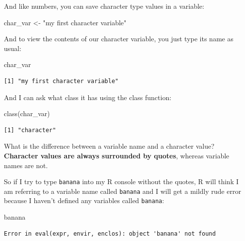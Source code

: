 \documentclass[
  letterpaper,
  DIV=11,
  numbers=noendperiod]{scrreprt}
\newenvironment{Shaded}{\begin{snugshade}}{\end{snugshade}}
\newcommand{\FunctionTok}[1]{\textcolor[rgb]{0.28,0.35,0.67}{#1}}
\newcommand{\NormalTok}[1]{\textcolor[rgb]{0.00,0.23,0.31}{#1}}
\newcommand{\OtherTok}[1]{\textcolor[rgb]{0.00,0.23,0.31}{#1}}
\newcommand{\StringTok}[1]{\textcolor[rgb]{0.13,0.47,0.30}{#1}}
\begin{document}
And like numbers, you can save character type values in a variable:

\begin{Shaded}
\begin{Highlighting}[]
\NormalTok{char\_var }\OtherTok{\textless{}{-}} \StringTok{"my first character variable"}
\end{Highlighting}
\end{Shaded}

And to view the contents of our character variable, you just type its
name as usual:

\begin{Shaded}
\begin{Highlighting}[]
\NormalTok{char\_var}
\end{Highlighting}
\end{Shaded}

\begin{verbatim}
[1] "my first character variable"
\end{verbatim}

And I can ask what class it has using the class function:

\begin{Shaded}
\begin{Highlighting}[]
\FunctionTok{class}\NormalTok{(char\_var)}
\end{Highlighting}
\end{Shaded}

\begin{verbatim}
[1] "character"
\end{verbatim}

What is the difference between a variable name and a character value?
\textbf{Character values are always surrounded by quotes}, whereas
variable names are not.

So if I try to type \texttt{banana} into my R console without the
quotes, R will think I am referring to a variable name called
\texttt{banana} and I will get a mildly rude error because I haven't
defined any variables called \texttt{banana}:

\begin{Shaded}
\begin{Highlighting}[]
\NormalTok{banana}
\end{Highlighting}
\end{Shaded}

\begin{verbatim}
Error in eval(expr, envir, enclos): object 'banana' not found
\end{verbatim}
\end{document}
